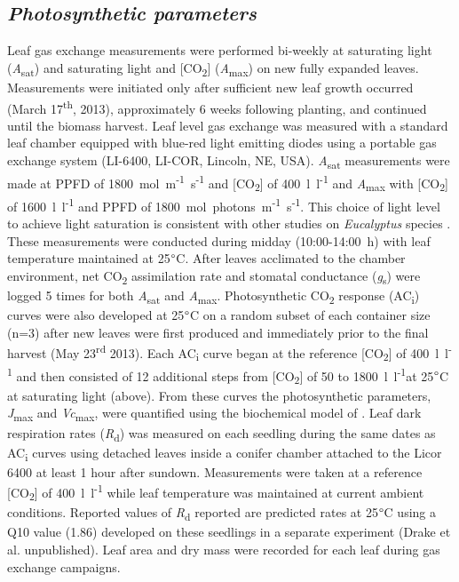 \documentclass[a4paper]{article}\usepackage[]{graphicx}\usepackage[]{color}
\begin{document}
\subsection*{\textit{Photosynthetic parameters}}
Leaf gas exchange measurements were performed bi-weekly at saturating light (\textit{A}\textsubscript{sat}) and saturating light and [CO\textsubscript{2}] (\textit{A}\textsubscript{max}) on new fully expanded leaves. Measurements were initiated only after sufficient new leaf growth occurred (March 17\textsuperscript{th}, 2013), approximately 6 weeks following planting, and continued until the biomass harvest. Leaf level gas exchange was measured with a standard leaf chamber equipped with blue-red light emitting diodes using a portable gas exchange system (LI-6400, LI-COR, Lincoln, NE, USA). \textit{A}\textsubscript{sat} measurements were made at PPFD of 1800~{\textmugreek}mol~m\textsuperscript{-1}~s\textsuperscript{-1} and [CO\textsubscript{2}] of 400~{\textmugreek}l~l\textsuperscript{-1} and \textit{A}\textsubscript{max} with [CO\textsubscript{2}] of 1600~{\textmugreek}l~l\textsuperscript{-1} and PPFD of 1800~{\textmugreek}mol~photons~m\textsuperscript{-1}~s\textsuperscript{-1}. This choice of light level to achieve light saturation is consistent with other studies on \textit{Eucalyptus} species \citep{kallarackal1997ecophysiological,pinkard1998photosynthetic,crous2013photosynthesis,drake2014capacity}. These measurements were conducted during midday (10:00-14:00~h) with leaf temperature maintained at 25$\degree$C. After leaves acclimated to the chamber environment, net CO\textsubscript{2} assimilation rate and stomatal conductance (\textit{g}\textsubscript{s}) were logged 5 times for both \textit{A}\textsubscript{sat} and \textit{A}\textsubscript{max}. Photosynthetic CO\textsubscript{2} response (AC\textsubscript{i}) curves were also developed at 25$\degree$C on a random subset of each container size (n=3) after new leaves were first produced and immediately prior to the final harvest (May 23\textsuperscript{rd} 2013). Each AC\textsubscript{i} curve began at the reference [CO\textsubscript{2}] of 400~{\textmugreek}l~l\textsuperscript{-1} and then consisted of 12 additional steps from [CO\textsubscript{2}] of 50 to 1800~{\textmugreek}l~l\textsuperscript{-1}at 25$\degree$C at saturating light (above). From these curves the photosynthetic parameters, \textit{J}\textsubscript{max} and \textit{Vc}\textsubscript{max}, were quantified using the biochemical model of \citet{farquhar1980biochemical}. Leaf dark respiration rates (\textit{R}\textsubscript{d}) was measured on each seedling during the same dates as AC\textsubscript{i} curves using detached leaves inside a conifer chamber attached to the Licor 6400 at least 1 hour after sundown.   Measurements were taken at a reference [CO\textsubscript{2}] of 400~{\textmugreek}l~l\textsuperscript{-1} while leaf temperature was maintained at current ambient conditions. Reported values of \textit{R}\textsubscript{d} reported are predicted rates at 25$\degree$C using a Q10 value (1.86) developed on these seedlings in a separate experiment (Drake et al. unpublished). Leaf area and dry mass were recorded for each leaf during gas exchange campaigns.
\end{document}
